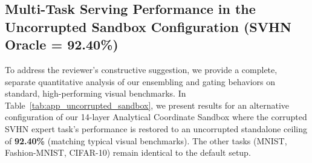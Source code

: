 \documentclass{article}
\theoremstyle{plain}
\theoremstyle{definition}
\theoremstyle{remark}
\begin{document}
\subsection{Multi-Task Serving Performance in the Uncorrupted Sandbox Configuration (SVHN Oracle = 92.40\%)}
To address the reviewer's constructive suggestion, we provide a complete, separate quantitative analysis of our ensembling and gating behaviors on standard, high-performing visual benchmarks. In Table~\ref{tab:app_uncorrupted_sandbox}, we present results for an alternative configuration of our 14-layer Analytical Coordinate Sandbox where the corrupted SVHN expert task's performance is restored to an uncorrupted standalone ceiling of \textbf{92.40\%} (matching typical visual benchmarks). The other tasks (MNIST, Fashion-MNIST, CIFAR-10) remain identical to the default setup.
\end{document}
